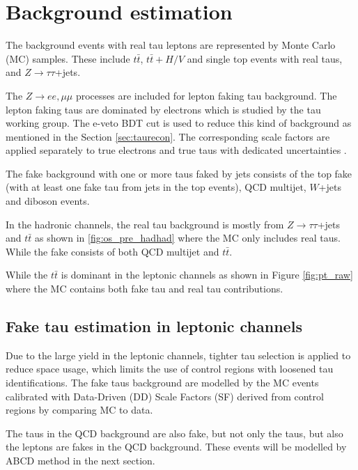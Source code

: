 \section{Background estimation}
\label{sec:background}



The background events with real tau leptons are represented by Monte Carlo (MC) samples. These include $t\bar{t}$, $t\bar{t}+H/V$ and 
single top events with real taus, and $Z\to\tau\tau$+jets.

The $Z\to ee,\mu\mu$ processes are included for lepton faking tau background. The lepton faking taus are dominated by electrons which is studied by the tau working group. The e-veto BDT cut is used to reduce this kind of background as mentioned in the Section \ref{sec:taurecon}. The corresponding scale factors are applied separately to true electrons and true taus with dedicated uncertainties \cite{TauCP}. 



The fake background with one or more taus faked by jets consists of the top fake (with at least one fake tau from jets in the top events), QCD multijet, $W$+jets and diboson events.

In the hadronic channels, the real tau background is mostly from $Z\to\tau\tau$+jets and $t\bar t$  as shown in \ref{fig:os_pre_hadhad} where the MC only includes real taus. While the fake consists of both QCD multijet and $t\bar t$.

While the $t\bar t$ is dominant in the leptonic channels as shown in Figure \ref{fig:pt_raw} where the MC contains both fake tau and real tau contributions.

\subsection{Fake tau estimation in leptonic channels}
\label{sec:sf_method}

Due to the large yield in the leptonic channels, tighter tau selection is applied to reduce space usage, which limits the use of control regions with loosened tau identifications. The fake taus background are modelled by the MC events calibrated with Data-Driven (DD) Scale Factors (SF) derived from control regions by comparing MC to data.

The taus in the QCD background are also fake, but not only the taus, but also the leptons are fakes in the QCD background. These events will be modelled by ABCD method in the next section.

